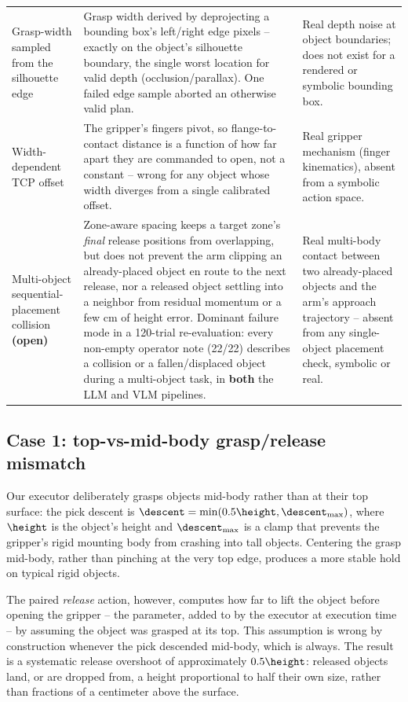 \begin{table}[t]
\begin{tabularx}{\textwidth}{@{}p{3.1cm}Xp{3.9cm}@{}}
\addlinespace
Grasp-width sampled from the silhouette edge &
  Grasp width derived by deprojecting a bounding box's left/right edge
  pixels -- exactly on the object's silhouette boundary, the single
  worst location for valid depth (occlusion/parallax). One failed edge
  sample aborted an otherwise valid plan. &
  Real depth noise at object boundaries; does not exist for a rendered or
  symbolic bounding box. \\
\addlinespace
Width-dependent TCP offset &
  The gripper's fingers pivot, so flange-to-contact distance is a
  function of how far apart they are commanded to open, not a constant
  -- wrong for any object whose width diverges from a single calibrated
  offset. &
  Real gripper mechanism (finger kinematics), absent from a symbolic
  action space. \\
\addlinespace
Multi-object sequential-placement collision \textbf{(open)} &
  Zone-aware spacing keeps a target zone's \emph{final} release positions
  from overlapping, but does not prevent the arm clipping an
  already-placed object en route to the next release, nor a released
  object settling into a neighbor from residual momentum or a few cm of
  height error. Dominant failure mode in a 120-trial re-evaluation: every
  non-empty operator note (22/22) describes a collision or a
  fallen/displaced object during a multi-object task, in \textbf{both}
  the LLM and VLM pipelines. &
  Real multi-body contact between two already-placed objects and the
  arm's approach trajectory -- absent from any single-object placement
  check, symbolic or real. \\
\bottomrule
\end{tabularx}
\end{table}

\subsection{Case 1: top-vs-mid-body grasp/release mismatch}
\label{sec:case-grasp-mismatch}

Our executor deliberately grasps objects mid-body rather than at their
top surface: the pick descent is $\descent = \min(0.5\height,
\descent_{\max})$, where $\height$ is the object's height and
$\descent_{\max}$ is a clamp that prevents the gripper's rigid mounting
body from crashing into tall objects. Centering the grasp mid-body, rather
than pinching at the very top edge, produces a more stable hold on
typical rigid objects.

The paired \emph{release} action, however, computes how far to lift the
object before opening the gripper -- the  parameter,
added to  by the executor at execution time --
by assuming the object was grasped at its top. This assumption is wrong
by construction whenever the pick descended mid-body, which is always. The
result is a systematic release overshoot of approximately $0.5\height$:
released objects land, or are dropped from, a height proportional to half
their own size, rather than fractions of a centimeter above the surface.

